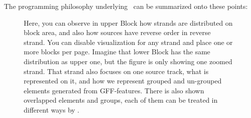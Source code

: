 %
%
%
%

The programming philosophy underlying \prog\ can be summarized onto these points:

\begin{figure}[!ht]
\begin{center}
	
	\caption[Plot distribution for elements found in GFF records]{Here, you can observe in upper Block how strands are distributed on block area, and also how sources have reverse order in reverse strand. You can disable visualization for any strand and place one or more blocks per page. Imagine that lower Block has the same distribution as upper one, but the figure is only showing one zoomed strand. That strand also focuses on one source track, what is represented on it, and how we represent grouped and un-grouped elements generated from GFF-features. There is also shown overlapped elements and groups, each of them can be treated in different ways by \prog.}
	\label{plothierarchy} 
\end{center}
\end{figure}


